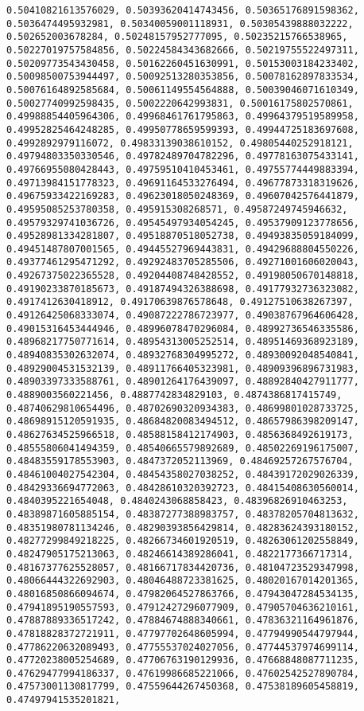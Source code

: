 \documentclass[11pt]{article}
\begin{document}
\begin{Verbatim}[commandchars=\\\{\}]
0.50410821613576029, 0.50393620414743456, 0.50365176891598362, 0.5036474495932981, 0.50340059001118931, 0.50305439888032222, 0.502652003678284, 0.50248157952777095, 0.50235215766538965, 0.50227019757584856, 0.50224584343682666, 0.50219755522497311, 0.50209773543430458, 0.50162260451630991, 0.50153003184233402, 0.50098500753944497, 0.50092513280353856, 0.50078162897833534, 0.50076164892585684, 0.50061149554564888, 0.50039046071610349, 0.50027740992598435, 0.5002220642993831, 0.50016175802570861, 0.49988854405964306, 0.49968461761795863, 0.49964379519589958, 0.49952825464248285, 0.49950778659599393, 0.49944725183697608, 0.4992892979116072, 0.49833139038610152, 0.49805440252918121, 0.49794803350330546, 0.49782489704782296, 0.49778163075433141, 0.49766955080428443, 0.49759510410453461, 0.49755774449883394, 0.49713984151778323, 0.49691164533276494, 0.49677873318319626, 0.49675933422169283, 0.49623018050248369, 0.49607042576441879, 0.49595085253780358, 0.495915308268571, 0.49587249745946632, 0.49579329741036726, 0.49545497934054245, 0.49537909123778656, 0.49528981334281807, 0.49518870518052738, 0.49493835059184099, 0.49451487807001565, 0.49445527969443831, 0.49429688804550226, 0.49377461295471292, 0.49292483705285506, 0.49271001606020043, 0.49267375022365528, 0.49204408748428552, 0.49198050670148818, 0.49190233870185673, 0.49187494326388698, 0.49177932736323082, 0.4917412630418912, 0.49170639876578648, 0.49127510638267397, 0.49126425068333074, 0.49087222786723977, 0.49038767964606428, 0.49015316453444946, 0.48996078470296084, 0.48992736546335586, 0.48968217750771614, 0.48954313005252514, 0.48951469368923189, 0.48940835302632074, 0.48932768304995272, 0.48930092048540841, 0.48929004531532139, 0.48911766405323981, 0.48909396896731983, 0.48903397333588761, 0.48901264176439097, 0.48892840427911777, 0.4889003560221456, 0.4887742834829103, 0.4874386817415749, 0.48740629810654496, 0.48702690320934383, 0.48699801028733725, 0.48698915120591935, 0.48684820083494512, 0.48657986398209147, 0.48627634525966518, 0.48588158412174903, 0.4856368492619173, 0.48555806041494359, 0.48540665579892689, 0.48502269196175007, 0.48483559178553903, 0.4847372052113969, 0.48469257267576704, 0.48461004027542304, 0.48454358027038252, 0.48439172029026339, 0.48429336694772063, 0.48428610320392723, 0.48415408630560014, 0.4840395221654048, 0.4840243068858423, 0.48396826910463253, 0.48389871605885154, 0.48387277388983757, 0.48378205704813632, 0.48351980781134246, 0.48290393856429814, 0.48283624393180152, 0.48277299849218225, 0.48266734601920519, 0.48263061202558849, 0.48247905175213063, 0.48246614389286041, 0.4822177366717314, 0.48167377625528057, 0.48166717834420736, 0.48104723529347998, 0.48066444322692903, 0.48046488723381625, 0.48020167014201365, 0.48016850866094674, 0.47982064527863766, 0.47943047284534135, 0.47941895190557593, 0.47912427296077909, 0.47905704636210161, 0.47887889336517242, 0.47884674888340661, 0.47836321164961876, 0.47818828372721911, 0.47797702648605994, 0.47794990544797944, 0.47786220632089493, 0.47755537024027056, 0.47744537974699114, 0.47720238005254689, 0.47706763190129936, 0.47668848087711235, 0.47629477994186337, 0.47619986685221066, 0.47602542527890784, 0.47573001130817799, 0.47559644267450368, 0.47538189605458819, 0.47497941535201821, 
\end{Verbatim}
\end{document}
